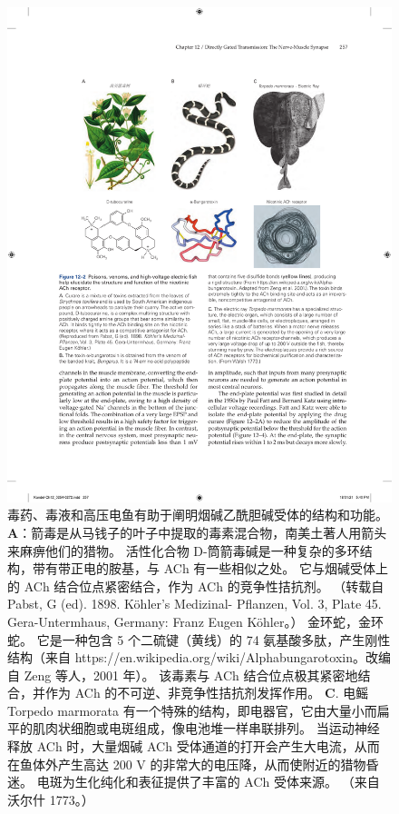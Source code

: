 \begin{figure}[htbp]
	\centering
	\includegraphics[width=0.8\linewidth]{chap12/fig_12_2}
	\caption{毒药、毒液和高压电鱼有助于阐明烟碱乙酰胆碱受体的结构和功能。 
	\textbf{A}：箭毒是从马钱子的叶子中提取的毒素混合物，南美土著人用箭头来麻痹他们的猎物。
	活性化合物 D-筒箭毒碱是一种复杂的多环结构，带有带正电的胺基，与 ACh 有一些相似之处。
	它与烟碱受体上的 ACh 结合位点紧密结合，作为 ACh 的竞争性拮抗剂。 （转载自 Pabst, G (ed). 1898. Köhler's Medizinal- Pflanzen, Vol. 3, Plate 45. Gera-Untermhaus, Germany: Franz Eugen Köhler。） 金环蛇，金环蛇。 它是一种包含 5 个二硫键（黄线）的 74 氨基酸多肽，产生刚性结构（来自 https://en.wikipedia.org/wiki/Alphabungarotoxin。改编自 Zeng 等人，2001 年）。
	该毒素与 ACh 结合位点极其紧密地结合，并作为 ACh 的不可逆、非竞争性拮抗剂发挥作用。
	\textbf{C}. 电鳐 Torpedo marmorata 有一个特殊的结构，即电器官，它由大量小而扁平的肌肉状细胞或电斑组成，像电池堆一样串联排列。 当运动神经释放 ACh 时，大量烟碱 ACh 受体通道的打开会产生大电流，从而在鱼体外产生高达 200 V 的非常大的电压降，从而使附近的猎物昏迷。 电斑为生化纯化和表征提供了丰富的 ACh 受体来源。 （来自沃尔什 1773。）}
	\label{fig:12_2}
\end{figure}


